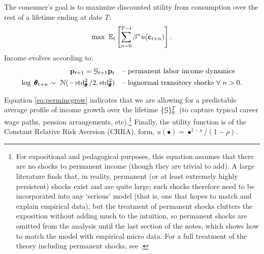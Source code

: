 \documentclass[titlepage, headings=optiontotocandhead]{Resources/texmf-local/tex/latex/econtex}
\begin{document}
The consumer's goal is to maximize discounted utility from consumption over the rest of a lifetime ending at date $T$:
  \begin{equation}\label{eq:MaxProb}
    \max~\operatorname{\mathbb{E}}_{t}\left[\sum_{n=0}^{T-t}\beta^{n} u(\mathbf{c}_{t+n})\right].
  \end{equation}
Income evolves according to:
  \begin{equation}\begin{gathered}\begin{aligned}
        \mathbf{p}_{t+1}   = \mathcal{G}_{t+1}\mathbf{p}_{t}                                        & \text{~~ -- permanent labor income dynamics} \label{eq:permincgrow}
        \\ \log ~ \pmb{\theta}_{t+n}  \sim ~\mathcal{N}(-\operatorname{std}_{\pmb{\theta}}^{2}/2,\operatorname{std}_{\pmb{\theta}}^{2}) & \text{~~ -- lognormal transitory shocks}~\forall~n>0 .
      \end{aligned}\end{gathered}\end{equation}

Equation \eqref{eq:permincgrow} indicates that we are allowing for a predictable average profile of income growth over the lifetime $\{\mathcal{G}\}_{0}^{T}$ (to capture typical career wage paths, pension arrangements, etc).\footnote{For expositional and pedagogical purposes, this equation assumes that there are no shocks to permanent income (though they are trivial to add).  A large literature finds that, in reality, permanent (or at least extremely highly persistent) shocks exist and are quite large; such shocks therefore need to be incorporated into any `serious' model (that is, one that hopes to match and explain empirical data), but the treatment of permanent shocks clutters the exposition without adding much to the intuition, so permanent shocks are omitted from the analysis until the last section of the notes, which shows how to match the model with empirical micro data.  For a full treatment of the theory including permanent shocks, see \cite{BufferStockTheory}.}  Finally, the utility function is of the Constant Relative Risk Aversion (CRRA), form, $u(\bullet) = \bullet^{1-\rho}/(1-\rho)$.
\end{document}
